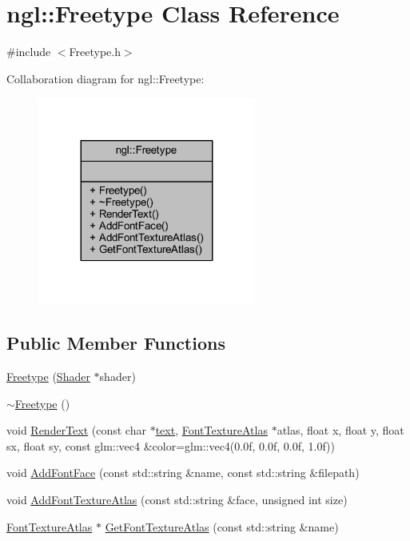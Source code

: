 \hypertarget{classngl_1_1_freetype}{}\section{ngl\+:\+:Freetype Class Reference}
\label{classngl_1_1_freetype}


{\ttfamily \#include $<$Freetype.\+h$>$}



Collaboration diagram for ngl\+:\+:Freetype\+:
\nopagebreak
\begin{figure}[H]
\begin{center}
\leavevmode
\includegraphics[width=203pt]{classngl_1_1_freetype__coll__graph}
\end{center}
\end{figure}
\subsection*{Public Member Functions}
\begin{DoxyCompactItemize}
\item 
\mbox{\hyperlink{classngl_1_1_freetype_ae4d2dae4184f7f3d6db679978c5330a3}{Freetype}} (\mbox{\hyperlink{classngl_1_1_shader}{Shader}} $\ast$shader)
\item 
\mbox{\hyperlink{classngl_1_1_freetype_a969f170d5006a1a7ee51f307806038ff}{$\sim$\+Freetype}} ()
\item 
void \mbox{\hyperlink{classngl_1_1_freetype_aaf698f09e19fccd8ada0e50262b4ddf2}{Render\+Text}} (const char $\ast$\mbox{\hyperlink{namespacengl_a5b20ff50635da5e3adb6bec00c062497a1cb251ec0d568de6a929b520c4aed8d1}{text}}, \mbox{\hyperlink{classngl_1_1_font_texture_atlas}{Font\+Texture\+Atlas}} $\ast$atlas, float x, float y, float sx, float sy, const glm\+::vec4 \&color=glm\+::vec4(0.\+0f, 0.\+0f, 0.\+0f, 1.\+0f))
\item 
void \mbox{\hyperlink{classngl_1_1_freetype_a18bd827a8b3fbb169ea4dc7544083851}{Add\+Font\+Face}} (const std\+::string \&name, const std\+::string \&filepath)
\item 
void \mbox{\hyperlink{classngl_1_1_freetype_a8758d36b4ca895fb3f98c38e40443ad6}{Add\+Font\+Texture\+Atlas}} (const std\+::string \&face, unsigned int size)
\item 
\mbox{\hyperlink{classngl_1_1_font_texture_atlas}{Font\+Texture\+Atlas}} $\ast$ \mbox{\hyperlink{classngl_1_1_freetype_a8e740af5ce9a17c8b39482eb57b46fba}{Get\+Font\+Texture\+Atlas}} (const std\+::string \&name)
\end{DoxyCompactItemize}


